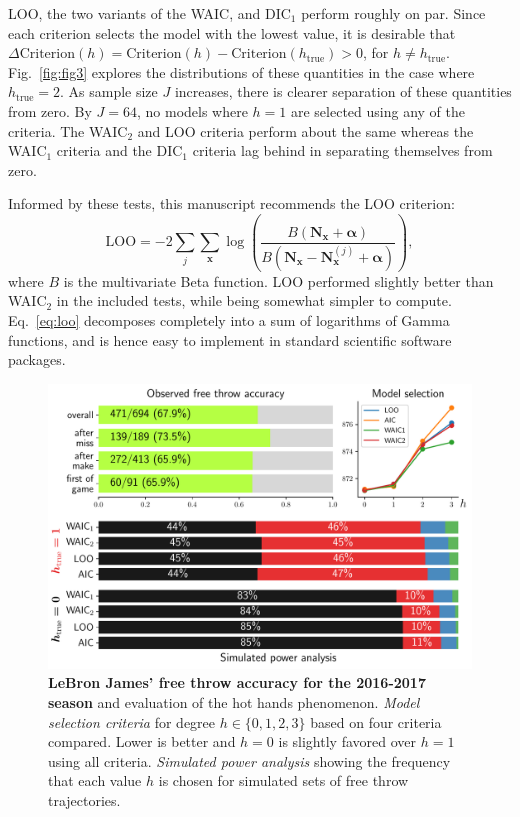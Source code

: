 \documentclass{IOS-Book-Article}
\newcommand{\bN}{\mathbf{N}}
\newcommand{\bx}{\mathbf{x}}
\newcommand{\balpha}{{\boldsymbol\alpha}}
\begin{document}
LOO, the two variants of the WAIC,  and DIC$_1$ perform roughly on par. Since each criterion selects the model with the lowest value, it is desirable that $\Delta\textrm{Criterion}(h)=\textrm{Criterion}(h)-\textrm{Criterion}(h_{\textrm{true}})>0$, for $h\neq h_{\textrm{true}}$. Fig.~\ref{fig:fig3} explores the distributions of these quantities in the case where $h_{\textrm{true}}=2$.  As sample size $J$ increases, there is clearer separation of these quantities from zero. By $J=64$, no models where $h=1$ are selected using any of the criteria. The WAIC$_2$ and LOO criteria perform about the same whereas the WAIC$_1$ criteria and the DIC$_1$ criteria lag behind in separating themselves from zero.


Informed by these tests, this manuscript recommends the LOO criterion:
\begin{equation}
\textrm{LOO} = -2\sum_j \sum_{\bx}  \log\left(  \frac{B(\bN_\bx  +\balpha)}{B(\bN_\bx -\bN_{\bx}^{(j)} +\balpha)} \right),
\label{eq:loo}
\end{equation}
where $B$ is the multivariate Beta function. LOO performed slightly better than WAIC$_2$ in the included tests, while being somewhat simpler to compute. Eq.~\ref{eq:loo} decomposes completely into a sum of logarithms of Gamma functions, and is hence easy to implement in standard scientific software packages.

\begin{figure}
\includegraphics[width=\linewidth]{fig4}
\caption{\textbf{LeBron James' free throw accuracy for the 2016-2017 season} and evaluation of the hot hands phenomenon. \emph{Model selection criteria} for degree $h\in\{0,1,2,3\}$ based on four criteria compared. Lower is better and $h=0$ is slightly favored over $h=1$ using all criteria. \emph{Simulated power analysis} showing the frequency that each value $h$ is chosen for simulated sets of free throw trajectories. }
\label{fig:freethrows}
\end{figure}
\end{document}
